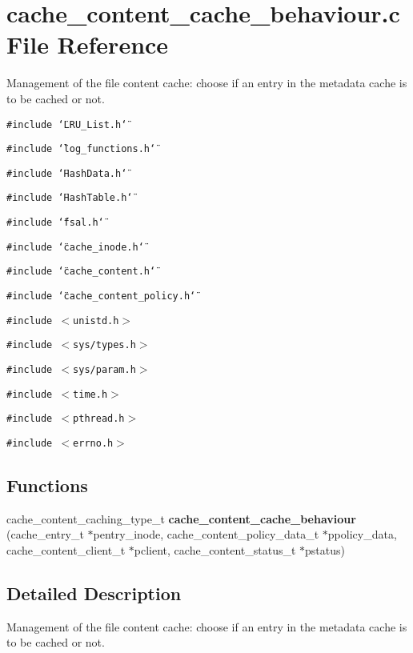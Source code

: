 \section{cache\_\-content\_\-cache\_\-behaviour.c File Reference}
\label{cache__content__cache__behaviour_8c}
Management of the file content cache: choose if an entry in the metadata cache is to be cached or not. 

{\tt \#include \char`\"{}LRU\_\-List.h\char`\"{}}\par
{\tt \#include \char`\"{}log\_\-functions.h\char`\"{}}\par
{\tt \#include \char`\"{}Hash\-Data.h\char`\"{}}\par
{\tt \#include \char`\"{}Hash\-Table.h\char`\"{}}\par
{\tt \#include \char`\"{}fsal.h\char`\"{}}\par
{\tt \#include \char`\"{}cache\_\-inode.h\char`\"{}}\par
{\tt \#include \char`\"{}cache\_\-content.h\char`\"{}}\par
{\tt \#include \char`\"{}cache\_\-content\_\-policy.h\char`\"{}}\par
{\tt \#include $<$unistd.h$>$}\par
{\tt \#include $<$sys/types.h$>$}\par
{\tt \#include $<$sys/param.h$>$}\par
{\tt \#include $<$time.h$>$}\par
{\tt \#include $<$pthread.h$>$}\par
{\tt \#include $<$errno.h$>$}\par
\subsection*{Functions}
\begin{CompactItemize}
\item 
cache\_\-content\_\-caching\_\-type\_\-t {\bf cache\_\-content\_\-cache\_\-behaviour} (cache\_\-entry\_\-t $\ast$pentry\_\-inode, cache\_\-content\_\-policy\_\-data\_\-t $\ast$ppolicy\_\-data, cache\_\-content\_\-client\_\-t $\ast$pclient, cache\_\-content\_\-status\_\-t $\ast$pstatus)
\end{CompactItemize}


\subsection{Detailed Description}
Management of the file content cache: choose if an entry in the metadata cache is to be cached or not. 


